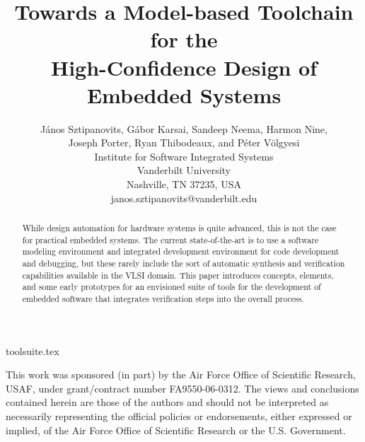\documentclass[times, 10pt,twocolumn]{article}
\begin{document}
\title{Towards a Model-based Toolchain for the \\
High-Confidence Design of Embedded Systems}

\author{J\'{a}nos Sztipanovits, G\'{a}bor Karsai, Sandeep Neema, Harmon Nine, \\
Joseph Porter, Ryan Thibodeaux, and  P\'{e}ter V\"{o}lgyesi \\
Institute for Software Integrated Systems \\
Vanderbilt University\\
Nashville, TN 37235, USA \\
janos.sztipanovits@vanderbilt.edu\\
}
\maketitle
\thispagestyle{empty}
\begin{abstract}
While design automation for hardware systems is quite advanced,
this is not the case for practical embedded systems. The current
state-of-the-art is to use a software modeling environment
and integrated development environment for code development and debugging, but
these rarely include the sort of automatic synthesis and
verification capabilities available in the VLSI domain. This paper
introduces concepts, elements, and some early prototypes for
an envisioned suite of tools for the development of embedded
software that integrates verification steps into the overall
process.
\end{abstract}



 {toolsuite.tex}



This work was sponsored (in part) by the Air Force Office of Scientific Research, USAF, under grant/contract number FA9550-06-0312.  The views and conclusions contained herein are those of the authors and should not be interpreted as necessarily representing the official policies or endorsements, either expressed or implied, of the Air Force Office of Scientific Research or the U.S. Government.


\end{document}
